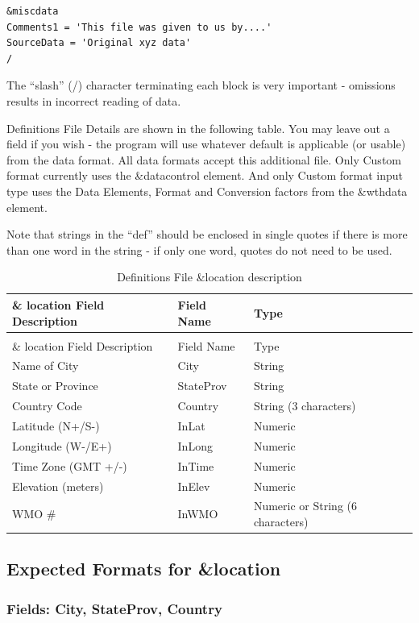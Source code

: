 \begin{lstlisting}
&miscdata
Comments1 = 'This file was given to us by....'
SourceData = 'Original xyz data'
/
\end{lstlisting}

The ``slash'' (/) character terminating each block is very important - omissions results in incorrect reading of data.

Definitions File Details are shown in the following table. You may leave out a field if you wish - the program will use whatever default is applicable (or usable) from the data format. All data formats accept this additional file. Only Custom format currently uses the \&datacontrol element. And only Custom format input type uses the Data Elements, Format and Conversion factors from the \&wthdata element.

Note that strings in the ``def'' should be enclosed in single quotes if there is more than one word in the string - if only one word, quotes do not need to be used.

\begin{longtable}[c]{p{2.12in}p{1.5in}p{2.37in}}
\caption{Definitions File \&location description \label{table:definitions-file-location-description}} \tabularnewline
\toprule 
\& location Field Description & Field Name & Type \tabularnewline \midrule
\endfirsthead

\caption[]{Definitions File \&location description} \tabularnewline
\toprule 
\& location Field Description & Field Name & Type \tabularnewline \midrule
\endhead

Name of City & City & String \tabularnewline
State or Province & StateProv & String \tabularnewline
Country Code & Country & String (3 characters) \tabularnewline
Latitude (N+/S-) & InLat & Numeric \tabularnewline
Longitude (W-/E+) & InLong & Numeric \tabularnewline
Time Zone (GMT +/-) & InTime & Numeric \tabularnewline
Elevation (meters) & InElev & Numeric \tabularnewline
WMO \# & InWMO & Numeric or String (6 characters) \tabularnewline
\bottomrule
\end{longtable}

\subsection{Expected Formats for \&location}\label{expected-formats-for-location}

\subsubsection{Fields: City, StateProv, Country}\label{fields-city-stateprov-country}

